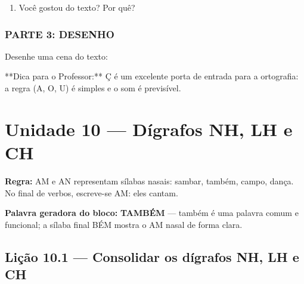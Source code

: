 \begin{exercicio}
\begin{enumerate}
  \item Você gostou do texto? Por quê?
  \begin{center}
  \underline{\hspace{12cm}}
  \end{center}

\end{enumerate}

\subsection*{PARTE 3: DESENHO}

Desenhe uma cena do texto:

\begin{center}
\end{center}

\end{exercicio}

\begin{dica}
**Dica para o Professor:** Ç é um excelente porta de entrada para a ortografia: a regra (A, O, U) é simples e o som é previsível.
\end{dica}



\chapter{Unidade 10 --- Dígrafos NH, LH e CH}


\textbf{Regra:} AM e AN representam sílabas nasais: sambar, também, campo, dança. No final de verbos, escreve-se AM: eles cantam.

\textbf{Palavra geradora do bloco:} \textbf{TAMBÉM} --- também é uma palavra comum e funcional; a sílaba final BÉM mostra o AM nasal de forma clara.

\section{Lição 10.1 --- Consolidar os dígrafos NH, LH e CH}

